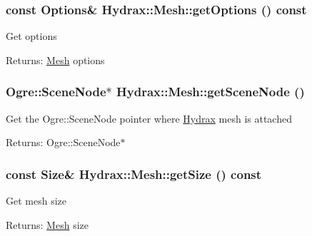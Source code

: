 \begin{CompactItemize}
{\subsubsection[{getOptions}]{\setlength{\rightskip}{0pt plus 5cm}const {\bf Options}\& Hydrax::Mesh::getOptions () const}}
\label{class_hydrax_1_1_mesh_691d01cdbb82e5d3cd92397fd17d97f6}


Get options \begin{Desc}
\item[Returns:]\hyperlink{class_hydrax_1_1_mesh}{Mesh} options \end{Desc}
\hypertarget{class_hydrax_1_1_mesh_92e7428d77bbc71b852a62a92ca882f5}{
\subsubsection[{getSceneNode}]{\setlength{\rightskip}{0pt plus 5cm}Ogre::SceneNode$\ast$ Hydrax::Mesh::getSceneNode ()}}
\label{class_hydrax_1_1_mesh_92e7428d77bbc71b852a62a92ca882f5}


Get the Ogre::SceneNode pointer where \hyperlink{class_hydrax_1_1_hydrax}{Hydrax} mesh is attached \begin{Desc}
\item[Returns:]Ogre::SceneNode$\ast$ \end{Desc}
\hypertarget{class_hydrax_1_1_mesh_4d55461e0da92344146340af91fab715}{
\subsubsection[{getSize}]{\setlength{\rightskip}{0pt plus 5cm}const {\bf Size}\& Hydrax::Mesh::getSize () const}}
\label{class_hydrax_1_1_mesh_4d55461e0da92344146340af91fab715}


Get mesh size \begin{Desc}
\item[Returns:]\hyperlink{class_hydrax_1_1_mesh}{Mesh} size \end{Desc}
\hypertarget{class_hydrax_1_1_mesh_2eca9f2fe7879fd541163a5b21b17323}{
}
\end{CompactItemize}
